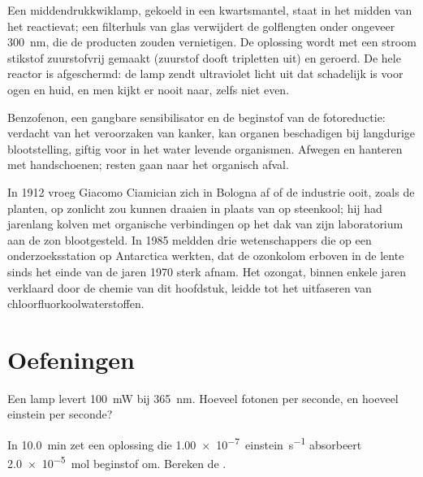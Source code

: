 \begin{inthelab}
Een middendrukkwiklamp, gekoeld in een kwartsmantel, staat in het midden
van het reactievat; een filterhuls van glas verwijdert de golflengten
onder ongeveer \qty{300}{nm}, die de producten zouden vernietigen. De
oplossing wordt met een stroom stikstof zuurstofvrij gemaakt (zuurstof
dooft tripletten uit) en geroerd. De hele reactor is afgeschermd: de lamp
zendt ultraviolet licht uit dat schadelijk is voor ogen en huid, en men
kijkt er nooit naar, zelfs niet even.
\end{inthelab}

\begin{safety}{}
Benzofenon, een gangbare sensibilisator en de beginstof van de
fotoreductie: verdacht van het veroorzaken van kanker, kan organen
beschadigen bij langdurige blootstelling, giftig voor in het water levende
organismen. Afwegen en hanteren met handschoenen; resten gaan naar het
organisch afval.
\end{safety}

\begin{history}
In 1912 vroeg Giacomo Ciamician zich in Bologna af of de industrie ooit,
zoals de planten, op zonlicht zou kunnen draaien in plaats van op steenkool;
hij had jarenlang kolven met organische verbindingen op het dak van zijn
laboratorium aan de zon blootgesteld. In 1985 meldden drie wetenschappers
die op een onderzoeksstation op Antarctica werkten, dat de ozonkolom
erboven in de lente sinds het einde van de jaren 1970 sterk afnam.
Het ozongat, binnen enkele jaren verklaard door de chemie van dit
hoofdstuk, leidde tot het uitfaseren van chloorfluorkoolwaterstoffen.
\end{history}

\section{Oefeningen}

\begin{exercise}[$\star$]\label{exo:b3:photochemistry:1}
Een lamp levert \qty{100}{mW} bij \qty{365}{nm}. Hoeveel fotonen per
seconde, en hoeveel einstein per seconde?
\end{exercise}

\begin{exercise}[$\star$]\label{exo:b3:photochemistry:2}
In \qty{10.0}{min} zet een oplossing die \qty{1.00e-7}{einstein.s^{-1}}
absorbeert
\qty{2.0e-5}{mol} beginstof om. Bereken de .
\end{exercise}

